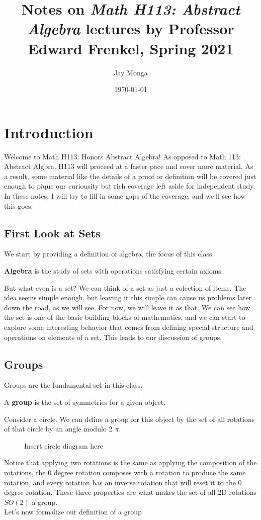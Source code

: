 \documentclass{report}
\begin{document}
\title{Notes on \textit{Math H113: Abstract Algebra} lectures by Professor Edward Frenkel, Spring 2021}
\author{Jay Monga}
\date{\today}
\maketitle

\tableofcontents

\chapter{Introduction}
Welcome to Math H113: Honors Abstract Algebra!
As opposed to Math 113: Abstract Algbra, H113 will proceed at a faster pace and cover more material.
As a result, some material like the details of a proof or definition will be covered just enough to pique our curiousity but rich coverage left aside for independent study.
In these notes, I will try to fill in some gaps of the coverage, and we'll see how this goes.

\section{First Look at Sets}
We start by providing a definition of algebra, the focus of this class.

\theoremstyle{definition}
\begin{definition}
    \textbf{Algebra} is the study of sets with operations satisfying certain axioms.
\end{definition}

But what even is a set?
We can think of a set as just a colection of items.
The idea seems simple enough, but leaving it this simple can cause us problems later down the road, as we will see.
For now, we will leave it as that.
We can see how the set is one of the basic building blocks of mathematics, and we can start to explore some interesting behavior that comes from defining special structure and operations on elements of a set.
This leads to our discussion of groups.

\section{Groups}
Groups are the fundamental set in this class.
\theoremstyle{definition}
\begin{definition}
A \textbf{group} is the set of symmetries for a given object.
\end{definition}
Consider a circle.
We can define a group for this object by the set of all rotations of that circle by an angle modulo 2 $\pi$. 
\begin{figure}
    \caption{Insert circle diagram here}
\end{figure}
Notice that applying two rotations is the same as applying the composition of the rotations, the 0 degree rotation composes with a rotation to produce the same rotation, and every rotation has an inverse rotation that will reset it to the 0 degree rotation.
These three properties are what makes the set of all 2D rotations $SO(2)$ a group. \\
Let's now formalize our definition of a group
\end{document}
